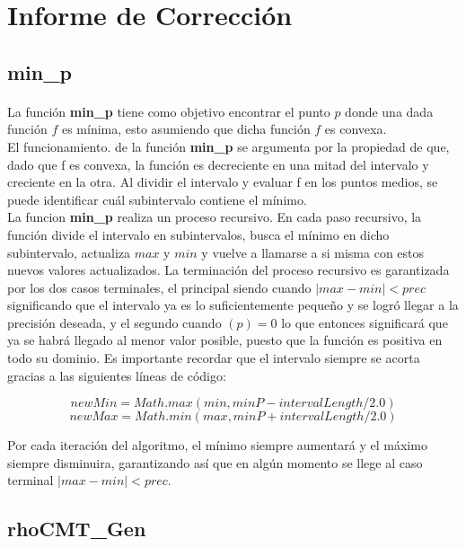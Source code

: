 \documentclass{article}
\begin{document}
  \section{Informe de Corrección}

    \subsection{min\_p}

    \paragraph{}
    La función \textbf{min\_p} tiene como objetivo encontrar el punto $p$ donde una dada función $f$ es mínima, esto asumiendo que dicha función $f$ es convexa.
    \\

    El funcionamiento. de la función \textbf{min\_p} se argumenta por la propiedad de que, dado que f es convexa, la función es decreciente en una mitad del intervalo y creciente en la otra. Al dividir el intervalo y evaluar f en los puntos medios, se puede identificar cuál subintervalo contiene el mínimo.
    \\

    La funcion \textbf{min\_p} realiza un proceso recursivo. En cada paso recursivo, la función divide el intervalo en subintervalos, busca el mínimo en dicho subintervalo, actualiza $max$ y $min$ y vuelve a llamarse a si misma con estos nuevos valores actualizados. La terminación del proceso recursivo es garantizada por los dos casos terminales, el principal siendo cuando $|max-min|<prec$ significando que el intervalo ya es lo suficientemente pequeño y se logró llegar a la precisión deseada, y el segundo cuando $(p)=0$ lo que entonces significará que ya se habrá llegado al menor valor posible, puesto que la función es positiva en todo su dominio. Es importante recordar que el intervalo siempre se acorta gracias a las siguientes líneas de código:
    
    \[newMin = Math.max(min, minP - intervalLength / 2.0)\]
    \[newMax = Math.min(max, minP + intervalLength / 2.0)\]

    Por cada iteración del algoritmo, el mínimo siempre aumentará y el máximo siempre disminuira, garantizando así que en algún momento se llege al caso terminal $|max-min|<prec$.

    \subsection{rhoCMT\_Gen}
	
\end{document}
